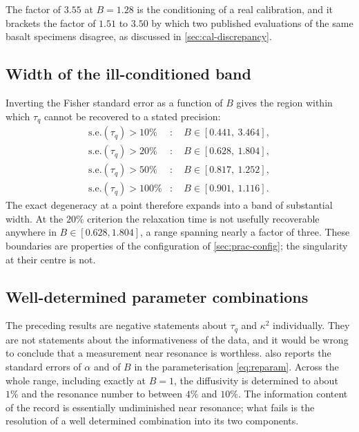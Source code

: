 \documentclass[preprint,12pt,a4paper]{elsarticle}
\theoremstyle{plain}
\theoremstyle{definition}
\theoremstyle{remark}
\newcommand{\tq}{\tau_{q}}
\newcommand{\kk}{\kappa^{2}}
\newcommand{\Bnum}{B}
\begin{document}
The factor of $3.55$ at $\Bnum = 1.28$ is the conditioning of a real
calibration, and it brackets the factor of $1.51$ to $3.50$ by which two
published evaluations of the same basalt specimens disagree, as discussed in
\cref{sec:cal-discrepancy}.




\subsection{Width of the ill-conditioned band}
\label{sec:prac-band}

Inverting the Fisher standard error as a function of $\Bnum$ gives the region
within which $\tq$ cannot be recovered to a stated precision:
%
\begin{align}
  \text{s.e.}(\tq) > 10\%  &: \quad \Bnum \in [0.441,\ 3.464] ,
  \label{eq:band10} \\
  \text{s.e.}(\tq) > 20\%  &: \quad \Bnum \in [0.628,\ 1.804] ,
  \label{eq:band20} \\
  \text{s.e.}(\tq) > 50\%  &: \quad \Bnum \in [0.817,\ 1.252] ,
  \label{eq:band50} \\
  \text{s.e.}(\tq) > 100\% &: \quad \Bnum \in [0.901,\ 1.116] .
  \label{eq:band100}
\end{align}
%
The exact degeneracy at a point therefore expands into a band of substantial
width. At the $20\%$ criterion the relaxation time is not usefully recoverable
anywhere in $\Bnum \in [0.628, 1.804]$, a range spanning nearly a factor of
three. These boundaries are properties of the configuration of
\cref{sec:prac-config}; the singularity at their centre is not.

\subsection{Well-determined parameter combinations}
\label{sec:prac-constructive}

The preceding results are negative statements about $\tq$ and $\kk$
individually. They are not statements about the informativeness of the data,
and it would be wrong to conclude that a measurement near resonance is
worthless.  also reports the standard errors of
$\alpha$ and of $\Bnum$ in the parameterisation \eqref{eq:reparam}. Across the
whole range, including exactly at $\Bnum = 1$, the diffusivity is determined to
about $1\%$ and the resonance number to between $4\%$ and $10\%$. The
information content of the record is essentially undiminished near resonance;
what fails is the resolution of a well determined combination into its two
components.
\end{document}
